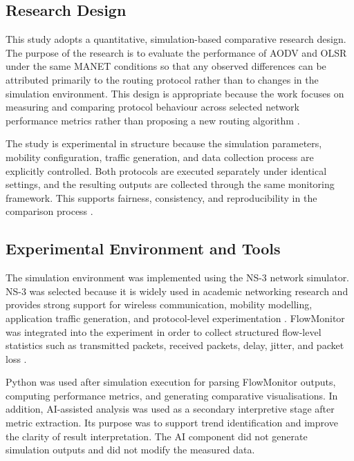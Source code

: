 \documentclass{Academic}
\begin{document}
\subsection{Research Design}

This study adopts a quantitative, simulation-based comparative research design. The purpose of the research is to evaluate the performance of AODV and OLSR under the same MANET conditions so that any observed differences can be attributed primarily to the routing protocol rather than to changes in the simulation environment. This design is appropriate because the work focuses on measuring and comparing protocol behaviour across selected network performance metrics rather than proposing a new routing algorithm \parencite{riley2010ns3,carneiro2009flowmonitor,selim2025}.

The study is experimental in structure because the simulation parameters, mobility configuration, traffic generation, and data collection process are explicitly controlled. Both protocols are executed separately under identical settings, and the resulting outputs are collected through the same monitoring framework. This supports fairness, consistency, and reproducibility in the comparison process \parencite{campanile2020,ns3tutorial,manetcompare}.

\subsection{Experimental Environment and Tools}

The simulation environment was implemented using the NS-3 network simulator. NS-3 was selected because it is widely used in academic networking research and provides strong support for wireless communication, mobility modelling, application traffic generation, and protocol-level experimentation \parencite{riley2010ns3,ns3tutorial,ns3modelibrary}. FlowMonitor was integrated into the experiment in order to collect structured flow-level statistics such as transmitted packets, received packets, delay, jitter, and packet loss \parencite{carneiro2009flowmonitor,ns3flowmonitordocs}.

Python was used after simulation execution for parsing FlowMonitor outputs, computing performance metrics, and generating comparative visualisations. In addition, AI-assisted analysis was used as a secondary interpretive stage after metric extraction. Its purpose was to support trend identification and improve the clarity of result interpretation. The AI component did not generate simulation outputs and did not modify the measured data.
\end{document}
